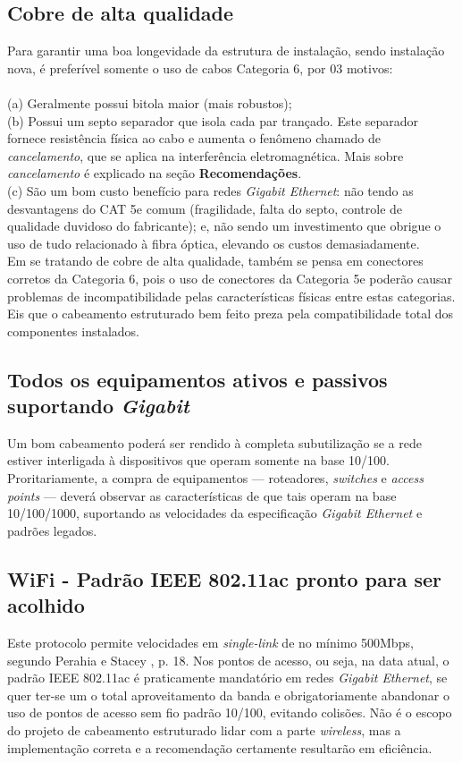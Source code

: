 \documentclass[	DIV=calc,%
							paper=a4,%
							fontsize=12pt,%
							onecolumn]{scrartcl}	 					%
\begin{document}
\subsection{Cobre de alta qualidade}
Para garantir uma boa longevidade da estrutura de instalação, sendo instalação nova, é preferível somente o uso de cabos Categoria 6, por 03 motivos: \\ \\
(a) Geralmente possui bitola maior (mais robustos);\\
(b) Possui um septo separador que isola cada par trançado. Este separador fornece resistência física ao cabo e aumenta o fenômeno chamado de \textit{cancelamento}, que se aplica na interferência eletromagnética. Mais sobre \textit{cancelamento} é explicado na seção \textbf{Recomendações}.\\
(c) São um bom custo benefício para redes \textit{Gigabit Ethernet}: não tendo as desvantagens do CAT 5e comum (fragilidade, falta do septo, controle de qualidade duvidoso do fabricante); e, não sendo um investimento que obrigue o uso de tudo relacionado à fibra óptica, elevando os custos demasiadamente.
\\

Em se tratando de cobre de alta qualidade, também se pensa em conectores corretos da Categoria 6, pois o uso de conectores da Categoria 5e poderão causar problemas de incompatibilidade pelas características físicas entre estas categorias. Eis que o cabeamento estruturado bem feito preza pela compatibilidade total dos componentes instalados.

\subsection{Todos os equipamentos ativos e passivos suportando \textit{Gigabit}}
Um bom cabeamento poderá ser rendido à completa subutilização se a rede estiver interligada à dispositivos que operam somente na base 10/100. Proritariamente, a compra de equipamentos --- roteadores, \textit{switches} e \textit{access points} --- deverá observar as características de que tais operam na base 10/100/1000, suportando as velocidades da especificação \textit{Gigabit Ethernet} e padrões legados.

\subsection{WiFi - Padrão IEEE 802.11ac pronto para ser acolhido}
Este protocolo permite velocidades em \textit{single-link} de no mínimo 500Mbps, segundo Perahia e Stacey \cite{perahia2013next}, p. 18. Nos pontos de acesso, ou seja, na data atual, o padrão IEEE 802.11ac é praticamente mandatório em redes \textit{Gigabit Ethernet}, se quer ter-se um o total aproveitamento da banda e obrigatoriamente abandonar o uso de pontos de acesso sem fio padrão 10/100, evitando colisões. Não é o escopo do projeto de cabeamento estruturado lidar com a parte \textit{wireless}, mas a implementação correta e a recomendação certamente resultarão em eficiência.
\end{document}
